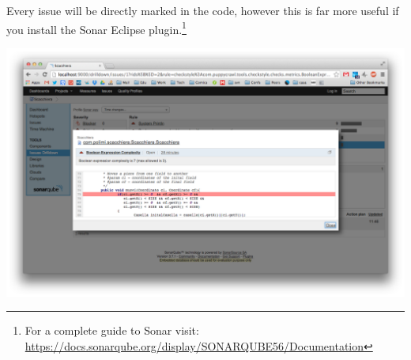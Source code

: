 \documentclass{article}
\begin{document}
Every issue will be directly marked in the code, however this is far
more useful if you install the Sonar Eclipse plugin.\footnote{For a
  complete guide to Sonar visit:
\url{https://docs.sonarqube.org/display/SONARQUBE56/Documentation}}
\begin{center}
\includegraphics[scale=0.3]{figures/ss4.png}
\end{center}






\fi
\end{document}
